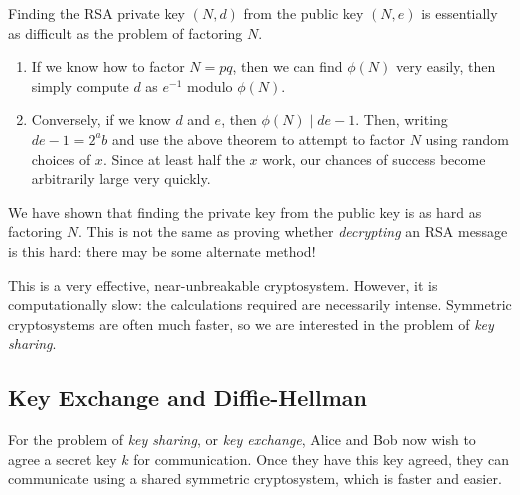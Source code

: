 \documentclass{article}
\begin{document}
\begin{corollary}
    Finding the RSA private key $(N, d)$ from the public key $(N, e)$ is essentially as difficult as the problem of factoring $N$.
    \begin{enumerate}
	    \item If we know how to factor $N = pq$, then we can find $\phi(N)$ very easily, then simply compute $d$ as $e^{-1}$ modulo $\phi(N)$.
	    \item Conversely, if we know $d$ and $e$, then $\phi(N) \mid de-1$. Then, writing $de-1 = 2^ab$ and use the above theorem to attempt to factor $N$ using random choices of $x$. Since at least half the $x$ work, our chances of success become arbitrarily large very quickly.
	\end{enumerate}
\end{corollary}

\begin{note}
	We have shown that finding the private key from the public key is as hard as factoring $N$. This is not the same as proving whether \textit{decrypting} an RSA message is this hard: there may be some alternate method!
\end{note}

This is a very effective, near-unbreakable cryptosystem. However, it is computationally slow: the calculations required are necessarily intense. Symmetric cryptosystems are often much faster, so we are interested in the problem of \textit{key sharing}.


\subsection{Key Exchange and Diffie-Hellman}

For the problem of \textit{key sharing}, or \textit{key exchange}, Alice and Bob now wish to agree a secret key $k$ for communication. Once they have this key agreed, they can communicate using a shared symmetric cryptosystem, which is faster and easier.
\end{document}
